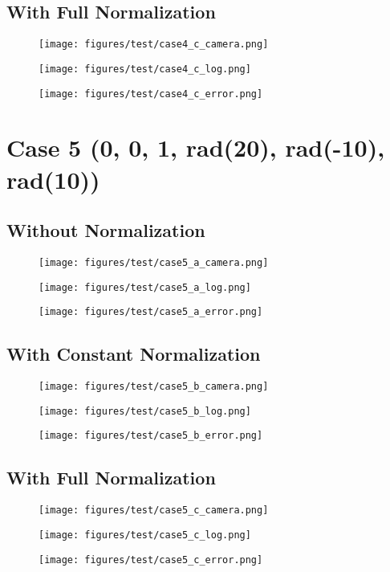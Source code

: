 \subsection{With Full Normalization}
\begin{figure}[ht!] \centering \texttt{[image: figures/test/case4\_c\_camera.png]} \end{figure}
\begin{figure}[ht!] \centering \texttt{[image: figures/test/case4\_c\_log.png]} \end{figure}
\begin{figure}[ht!] \centering \texttt{[image: figures/test/case4\_c\_error.png]} \end{figure}
\clearpage

\section{Case 5 (0, 0, 1, rad(20), rad(-10), rad(10))}
\subsection{Without Normalization}
\begin{figure}[ht!] \centering \texttt{[image: figures/test/case5\_a\_camera.png]} \end{figure}
\begin{figure}[ht!] \centering \texttt{[image: figures/test/case5\_a\_log.png]} \end{figure}
\begin{figure}[ht!] \centering \texttt{[image: figures/test/case5\_a\_error.png]} \end{figure}
\clearpage
\subsection{With Constant Normalization}
\begin{figure}[ht!] \centering \texttt{[image: figures/test/case5\_b\_camera.png]} \end{figure}
\begin{figure}[ht!] \centering \texttt{[image: figures/test/case5\_b\_log.png]} \end{figure}
\begin{figure}[ht!] \centering \texttt{[image: figures/test/case5\_b\_error.png]} \end{figure}
\clearpage
\subsection{With Full Normalization}
\begin{figure}[ht!] \centering \texttt{[image: figures/test/case5\_c\_camera.png]} \end{figure}
\begin{figure}[ht!] \centering \texttt{[image: figures/test/case5\_c\_log.png]} \end{figure}
\begin{figure}[ht!] \centering \texttt{[image: figures/test/case5\_c\_error.png]} \end{figure}
\clearpage

